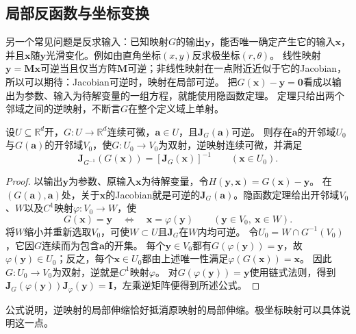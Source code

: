 

\subsection{局部反函数与坐标变换}

另一个常见问题是反求输入：已知映射$G$的输出$\bm y$，能否唯一确定产生它的输入$\bm x$，并且$\bm x$随$\bm y$光滑变化。例如由直角坐标$(x,y)$反求极坐标$(r,\theta)$。
线性映射$\bm y=\bm M\bm x$可逆当且仅当方阵$\bm M$可逆；非线性映射在一点附近近似于它的Jacobian，所以可以期待：Jacobian可逆时，映射在局部可逆。
把$G(\bm x)-\bm y=\bm 0$看成以输出为参数、输入为待解变量的一组方程，就能使用隐函数定理。
定理只给出两个邻域之间的逆映射，不断言$G$在整个定义域上单射。
\begin{theorem}[局部反函数定理]
\label{thm:multivariable-inverse-function}
设$U\subseteq\mathbb R^d$开，$G:U\to\mathbb R^d$连续可微，$\bm a\in U$，且$\bm J_G(\bm a)$可逆。
则存在$\bm a$的开邻域$U_0$与$G(\bm a)$的开邻域$V_0$，使$G:U_0\to V_0$为双射，逆映射连续可微，并满足
\[
 \bm J_{G^{-1}}(G(\bm x))=[\bm J_G(\bm x)]^{-1}
 \qquad(\bm x\in U_0).
\]
\end{theorem}
\begin{proof}
以输出$\bm y$为参数、原输入$\bm x$为待解变量，令$H(\bm y,\bm x)=G(\bm x)-\bm y$。
在$(G(\bm a),\bm a)$处，关于$\bm x$的Jacobian就是可逆的$\bm J_G(\bm a)$。隐函数定理给出开邻域$V_0$、$W$以及$C^1$映射$\varphi:V_0\to W$，使
\[
 G(\bm x)=\bm y\quad\Longleftrightarrow\quad\bm x=\varphi(\bm y)
 \qquad(\bm y\in V_0,\ \bm x\in W).
\]
将$W$缩小并重新选取$V_0$，可使$W\subset U$且$\bm J_G$在$W$内均可逆。
令$U_0=W\cap G^{-1}(V_0)$，它因$G$连续而为包含$\bm a$的开集。
每个$\bm y\in V_0$都有$G(\varphi(\bm y))=\bm y$，故$\varphi(\bm y)\in U_0$；反之，每个$\bm x\in U_0$都由上述唯一性满足$\varphi(G(\bm x))=\bm x$。
因此$G:U_0\to V_0$为双射，逆就是$C^1$映射$\varphi$。
对$G(\varphi(\bm y))=\bm y$使用链式法则，得到$\bm J_G(\varphi(\bm y))\bm J_\varphi(\bm y)=\bm I$，左乘逆矩阵便得到所述公式。
\end{proof}
公式说明，逆映射的局部伸缩恰好抵消原映射的局部伸缩。极坐标映射可以具体说明这一点。
